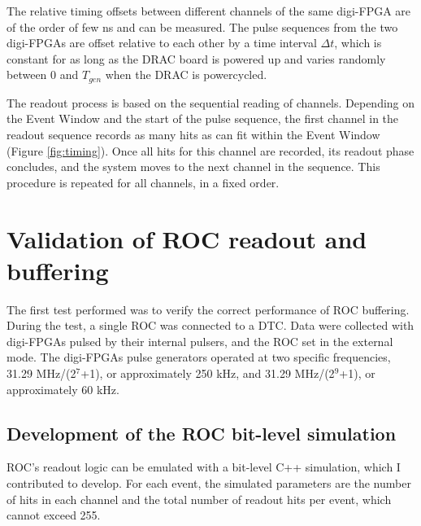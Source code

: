     The relative timing offsets between different channels of 
    the same digi-FPGA are of the order of few ns and can be 
    measured. The pulse sequences from the two digi-FPGAs are offset 
    relative to each other by a time interval $\Delta t$, which is 
    constant for as long as the DRAC board is 
    powered up and varies randomly between 0 and $T_{gen}$ 
    when the DRAC is powercycled.

    The readout process is based on the sequential reading of channels.
    Depending on the Event Window and the start of the pulse sequence, 
    the first channel in the readout sequence records as many hits as can 
    fit within the Event Window (Figure \ref{fig:timing}). Once all hits for this 
    channel are recorded, its readout phase concludes, and the system moves 
    to the next channel in the sequence. This procedure is repeated for all 
    channels, in a fixed order.
    
\section{Validation of ROC readout and buffering}
The first test performed was to verify the correct performance of 
ROC buffering.
During the test, a single ROC was connected to a DTC. 
Data were collected with digi-FPGAs pulsed by their internal pulsers, 
and the ROC set in the external mode. 
The digi-FPGAs pulse generators operated at two specific frequencies, 
31.29 MHz/(2$^7$+1), or approximately 250 kHz, 
and 31.29 MHz/(2$^9$+1), or approximately 60 kHz.
        
\subsection{Development of the ROC bit-level simulation}\label{MonteCarlo}
 
ROC's readout logic can be 
emulated with a bit-level C++ simulation, 
which I contributed to develop. 
For each event, the simulated parameters 
are the number of hits in each channel and the total 
number of readout hits per event, which cannot exceed 255. 


